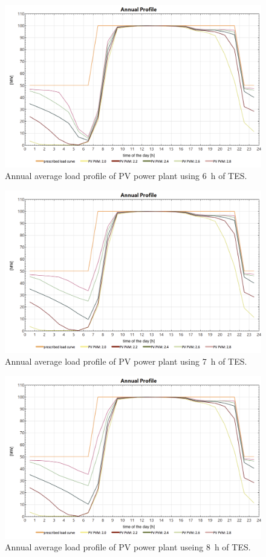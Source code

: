 %
\begin{figure}[htbp]  
\centering
\includegraphics[width=0.8\linewidth]{FIG/Appendix_LCC/PV6h}
\caption[Annual average load profile of PV power plant using 6~h of TES.]{Annual average load profile of PV power plant using 6~h of TES.}\label{PV6h}
\end{figure}
%
\begin{figure}[htbp]  
\centering
\includegraphics[width=0.8\linewidth]{FIG/Appendix_LCC/PV7h}
\caption[Annual average load profile of PV power plant using 7~h of TES.]{Annual average load profile of PV power plant using 7~h of TES.}\label{PV7h}
\end{figure}
%
\begin{figure}[htbp]  
\centering
\includegraphics[width=0.8\linewidth]{FIG/Appendix_LCC/PV8h}
\caption[Annual average load profile of PV power plant useing 8~h of TES.]{Annual average load profile of PV power plant useing 8~h of TES.}\label{PV8h}
\end{figure}
%

\pagebreak